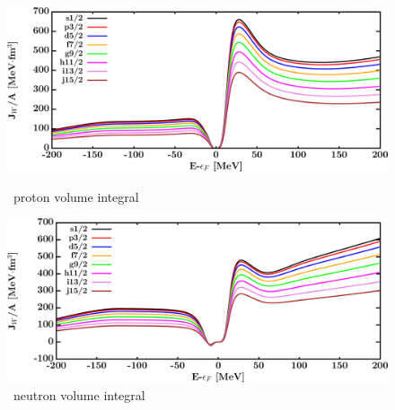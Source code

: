 \begin{figure}[hbtp]
    \centering
    \begin{minipage}{0.42\textwidth}
        \centering
        \includegraphics[width=\textwidth]{figures/ni58_protonVolumeIntegrals.png}
        \caption*{\niEight\ proton volume integral}
        \label{DOMFitData_ni58_proton_potentialIntegral}
    \end{minipage}\hspace{6pt}
    \begin{minipage}{0.42\textwidth}
        \centering
        \includegraphics[width=\textwidth]{figures/ni58_neutronVolumeIntegrals.png}
        \caption*{\niEight\ neutron volume integral}
        \label{DOMFitData_ni58_neutron_potentialIntegral}
    \end{minipage}
\end{figure}
